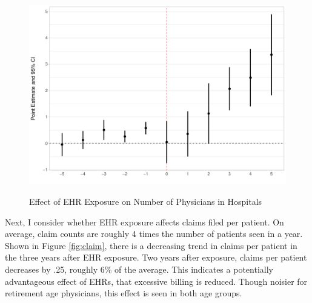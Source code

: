 \documentclass[12pt]{article}
\begin{document}
\begin{figure}[ht]
    \centering
    \captionsetup{width=.85\linewidth}
    \caption{Effect of EHR Exposure on Number of Physicians in Hospitals}
    \includegraphics[scale=.4]{Objects/numberofphysicians_plot.pdf}
    \label{fig:numphys}
\end{figure}

Next, I consider whether EHR exposure affects claims filed per patient. On average, claim counts are roughly 4 times the number of patients seen in a year. Shown in Figure \ref{fig:claim}, there is a decreasing trend in claims per patient in the three years after EHR exposure. Two years after exposure, claims per patient decreases by .25, roughly 6\% of the average. This indicates a potentially advantageous effect of EHRs, that excessive billing is reduced. Though noisier for retirement age physicians, this effect is seen in both age groups.    
\end{document}
